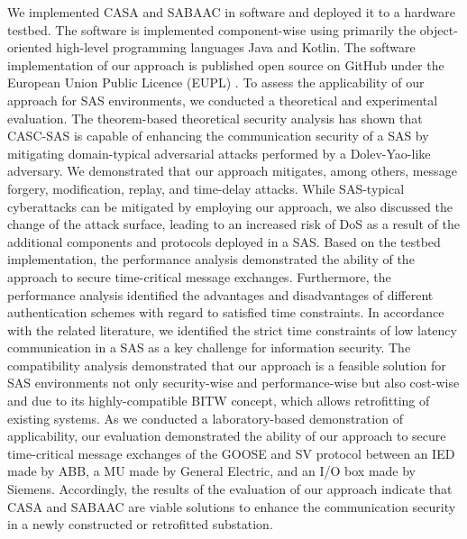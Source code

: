 We implemented CASA and SABAAC in software and deployed it to a hardware testbed.
The software is implemented component-wise using primarily the object-oriented high-level programming languages Java and Kotlin.
The software implementation of our approach is published open source on GitHub \cite{gitcasc} under the European Union Public Licence (EUPL) \cite{eupl}.
To assess the applicability of our approach for SAS environments, we conducted a theoretical and experimental evaluation.
The theorem-based theoretical security analysis has shown that CASC-SAS is capable of enhancing the communication security of a SAS by mitigating domain-typical adversarial attacks performed by a Dolev-Yao-like adversary.
We demonstrated that our approach mitigates, among others, message forgery, modification, replay, and time-delay attacks.
While SAS-typical cyberattacks can be mitigated by employing our approach, we also discussed the change of the attack surface, leading to an increased risk of DoS as a result of the additional components and protocols deployed in a SAS.
Based on the testbed implementation, the performance analysis demonstrated the ability of the approach to secure time-critical message exchanges.
Furthermore, the performance analysis identified the advantages and disadvantages of different authentication schemes with regard to satisfied time constraints.
In accordance with the related literature, we identified the strict time constraints of low latency communication in a SAS as a key challenge for information security.
The compatibility analysis demonstrated that our approach is a feasible solution for SAS environments not only security-wise and performance-wise but also cost-wise and due to its highly-compatible BITW concept, which allows retrofitting of existing systems.
As we conducted a laboratory-based demonstration of applicability, our evaluation demonstrated the ability of our approach to secure time-critical message exchanges of the GOOSE and SV protocol between an IED made by ABB, a MU made by General Electric, and an I/O box made by Siemens.
Accordingly, the results of the evaluation of our approach indicate that CASA and SABAAC are viable solutions to enhance the communication security in a newly constructed or retrofitted substation.
